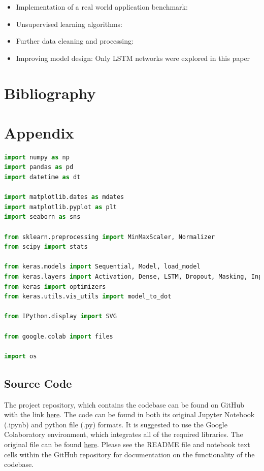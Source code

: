 \documentclass[10pt,onecolumn,letterpaper]{article}
\begin{document}
\begin{itemize}
	\item Implementation of a real world application benchmark: 
	\item Unsupervised learning algorithms:
	\item Further data cleaning and processing:
	\item Improving model design: Only LSTM networks were explored in this paper
\end{itemize}

\newpage

\section{Bibliography}

{
\small


}

\newpage
 
\section{Appendix}

\begin{lstlisting}[language=Python, breaklines=true, label={libraries}, caption={Depiction of the list of external packages used to develop the model. These packages are roughly split by use case; mathematical structuring, data visualisation, functionalities required, machine learning tools and miscellaneous.}]
import numpy as np
import pandas as pd
import datetime as dt

import matplotlib.dates as mdates
import matplotlib.pyplot as plt
import seaborn as sns

from sklearn.preprocessing import MinMaxScaler, Normalizer
from scipy import stats

from keras.models import Sequential, Model, load_model
from keras.layers import Activation, Dense, LSTM, Dropout, Masking, Input
from keras import optimizers
from keras.utils.vis_utils import model_to_dot

from IPython.display import SVG

from google.colab import files

import os
\end{lstlisting} 

\subsection{Source Code} \label{source code}

The project repository, which contains the codebase can be found on GitHub with the link \href{https://github.com/twutang/SXNP-Factor-Models}{here}. The code can be found in both its original Jupyter Notebook (.ipynb) and python file (.py) formats. It is suggested to use the Google Colaboratory environment, which integrates all of the required libraries. The original file can be found \href{https://colab.research.google.com/drive/1IHPEI-sPNSS0rKdFThywR4LTpeOt0Z_y}{here}. Please see the README file and notebook text cells within the GitHub repository for documentation on the functionality of the codebase. 
\end{document}

